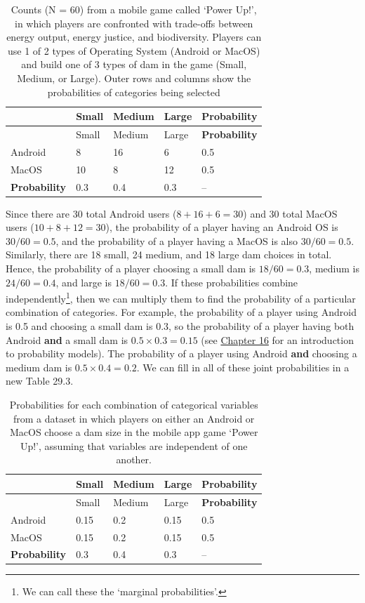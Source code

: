 \documentclass[
]{scrbook}
\begin{document}
\begin{longtable}[]{@{}lllll@{}}
\caption{\label{tab:unnamed-chunk-140}Counts (N = 60) from a mobile game called `Power Up!', in which players are confronted with trade-offs between energy output, energy justice, and biodiversity. Players can use 1 of 2 types of Operating System (Android or MacOS) and build one of 3 types of dam in the game (Small, Medium, or Large). Outer rows and columns show the probabilities of categories being selected}\tabularnewline
\toprule
& Small & Medium & Large & \textbf{Probability} \\
\midrule
\endfirsthead
\toprule
& Small & Medium & Large & \textbf{Probability} \\
\midrule
\endhead
Android & 8 & 16 & 6 & 0.5 \\
MacOS & 10 & 8 & 12 & 0.5 \\
\textbf{Probability} & 0.3 & 0.4 & 0.3 & -- \\
\bottomrule
\end{longtable}

Since there are 30 total Android users (\(8 + 16 + 6 = 30\)) and 30 total MacOS users (\(10 + 8 + 12 = 30\)), the probability of a player having an Android OS is \(30/60 = 0.5\), and the probability of a player having a MacOS is also \(30 / 60 = 0.5\).
Similarly, there are 18 small, 24 medium, and 18 large dam choices in total.
Hence, the probability of a player choosing a small dam is \(18/60 = 0.3\), medium is \(24/60 = 0.4\), and large is \(18/60 = 0.3\).
If these probabilities combine independently\footnote{We can call these the `marginal probabilities'.}, then we can multiply them to find the probability of a particular combination of categories.
For example, the probability of a player using Android is 0.5 and choosing a small dam is 0.3, so the probability of a player having both Android \textbf{and} a small dam is \(0.5 \times 0.3 = 0.15\) (see \protect\hyperlink{Chapter_16}{Chapter 16} for an introduction to probability models).
The probability of a player using Android \textbf{and} choosing a medium dam is \(0.5 \times 0.4 = 0.2\).
We can fill in all of these joint probabilities in a new Table 29.3.

\begin{longtable}[]{@{}lllll@{}}
\caption{\label{tab:unnamed-chunk-141}Probabilities for each combination of categorical variables from a dataset in which players on either an Android or MacOS choose a dam size in the mobile app game `Power Up!', assuming that variables are independent of one another.}\tabularnewline
\toprule
& Small & Medium & Large & \textbf{Probability} \\
\midrule
\endfirsthead
\toprule
& Small & Medium & Large & \textbf{Probability} \\
\midrule
\endhead
Android & 0.15 & 0.2 & 0.15 & 0.5 \\
MacOS & 0.15 & 0.2 & 0.15 & 0.5 \\
\textbf{Probability} & 0.3 & 0.4 & 0.3 & -- \\
\bottomrule
\end{longtable}
\end{document}
